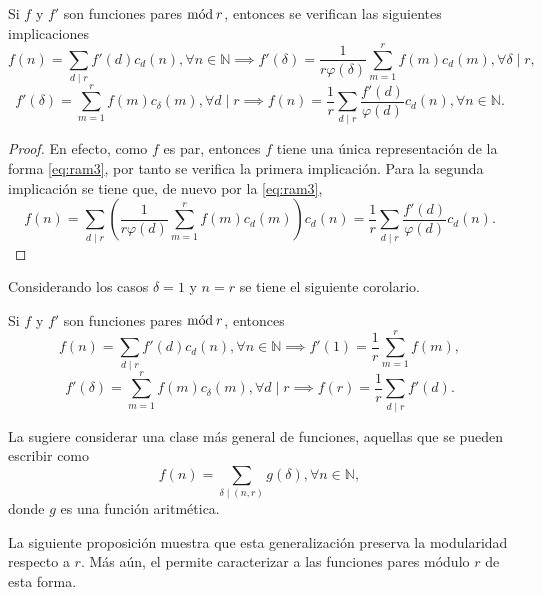 \begin{corollary}
Si $f$ y $f'$ son funciones pares $\mathrm{m\acute{o}d\:}r$, entonces se verifican las siguientes implicaciones
\begin{equation*}
    f(n) = \sum_{d \mid r} f'(d) c_d(n), \forall n \in \mathbb{N} \implies f'(\delta) = \frac{1}{r \varphi(\delta)} \sum_{m=1}^{r} f(m) c_d(m), \forall \delta \mid r,
\end{equation*}
\begin{equation*}
    f'(\delta) = \sum_{m=1}^{r} f(m) c_{\delta} (m), \forall d \mid r \implies f(n) = \frac{1}{r} \sum_{d \mid r} \frac{f'(d)}{\varphi(d)} c_d(n), \forall n \in \mathbb{N}.
\end{equation*}
\end{corollary}
\begin{proof}
En efecto, como $f$ es par, entonces $f$ tiene una única representación de la forma \eqref{eq:ram3}, por tanto se verifica la primera implicación. Para la segunda implicación se tiene que, de nuevo por la \cref{eq:ram3},
\begin{equation*}
    f(n) = \sum_{d \mid r} \left( \frac{1}{r \varphi(d)} \sum_{m=1}^{r} f(m) c_d(m) \right) c_d(n) = \frac{1}{r} \sum_{d \mid r} \frac{f'(d)}{\varphi(d)} c_d(n).
\end{equation*}
\end{proof}

Considerando los casos $\delta=1$ y $n=r$ se tiene el siguiente corolario.

\begin{corollary}
Si $f$ y $f'$ son funciones pares $\mathrm{m\acute{o}d\:}r$, entonces
\begin{equation*}
    f(n) = \sum_{d \mid r} f'(d) c_d(n), \forall n \in \mathbb{N} \implies f'(1) = \frac{1}{r} \sum_{m=1}^{r} f(m),
\end{equation*}
\begin{equation*}
    f'(\delta) = \sum_{m=1}^{r} f(m) c_{\delta}(m), \forall d \mid r \implies f(r) = \frac{1}{r} \sum_{d \mid r} f'(d).
\end{equation*}
\end{corollary}

La  sugiere considerar una clase más general de funciones, aquellas que se pueden escribir como
\begin{equation*}
    f(n) = \sum_{\delta \mid (n,r)} g(\delta), \forall n \in \mathbb{N},
\end{equation*}
donde $g$ es una función aritmética.
\bigskip

La siguiente proposición muestra que esta generalización preserva la modularidad respecto a $r$. Más aún, el  permite caracterizar a las funciones pares módulo $r$ de esta forma.

